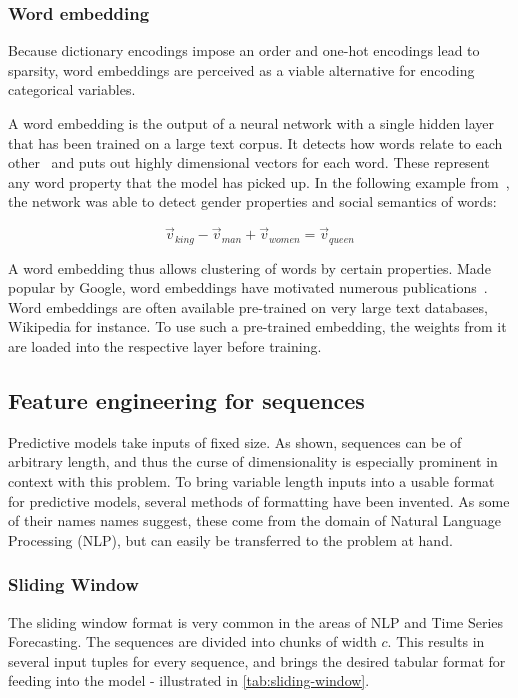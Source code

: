 \subsubsection*{Word embedding}
Because dictionary encodings impose an order and one-hot encodings lead to sparsity, word embeddings are perceived as a viable alternative for encoding categorical variables.

A word embedding is the output of a neural network with a single hidden layer that has been trained on a large text corpus. It detects how words relate to each other~\cite{web:word-embedding} and puts out highly dimensional vectors for each word. These represent any word property that the model has picked up. In the following example from~\cite{web:word-embedding}, the network was able to detect gender properties and social semantics of words:

$$
\vec{v}_{king} - \vec{v}_{man} + \vec{v}_{women} = \vec{v}_{queen}
$$

A word embedding thus allows clustering of words by certain properties. Made popular by Google, word embeddings have motivated numerous publications~\cite{web:ahogrammer, goldberg2014word2vec}. Word embeddings are often available pre-trained on very large text databases, Wikipedia for instance. To use such a pre-trained embedding, the weights from it are  loaded into the respective layer before training.

\subsection{Feature engineering for sequences}
\label{sec:sequential-feature-engineering}
Predictive models take inputs of fixed size. As shown, sequences can be of arbitrary length, and thus the curse of dimensionality is especially prominent in context with this problem. To bring variable length inputs into a usable format for predictive models, several methods of formatting have been invented. As some of their names names suggest, these come from the domain of Natural Language Processing (NLP), but can easily be transferred to the problem at hand.

\subsubsection*{Sliding Window}
The sliding window format is very common in the areas of NLP and Time Series Forecasting. The sequences are divided into chunks of width $c$. This results in several input tuples for every sequence, and brings the desired tabular format for feeding into the model - illustrated in \autoref{tab:sliding-window}.

